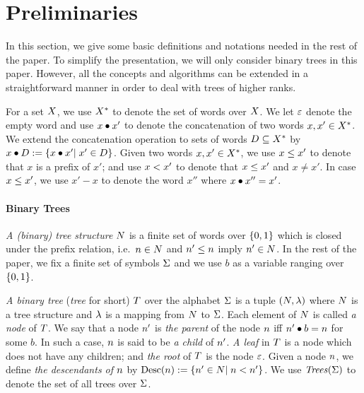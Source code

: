 \section{Preliminaries}
\label{sec:prels}
%
In this section, we give some basic definitions and notations needed in 
the rest of the paper.
%
To simplify the presentation, we will only consider binary trees in this paper.
%
However, all the concepts and algorithms can be extended in a straightforward manner in order to deal
with trees of higher ranks.
%

For a set $X$, we use ${X}^*$ to denote the set of words over $X$.
%
We let $\varepsilon$ denote the empty word and use $x\bullet x'$ to denote 
the concatenation of two words $x,x'\in{X}^*$.
%
We extend the concatenation operation to sets of words $D\subseteq{
X}^*$ by $x\bullet D:=\left\{x\bullet x'|\;x'\in D\right\}$.
%
Given two words $x,x'\in{X}^*$, we use $x\le x'$ to denote that $x$ 
is a prefix of $x'$; and use $x< x'$ to denote that $x\le x'$ and $x\neq x'$.
%
In case $x\le x'$, we use $x'-x$ to denote the word $x''$ where $x\bullet x''=x'$.
%

\paragraph{\bf Binary Trees}
%
\emph{A (binary) tree structure} $N$ is a finite set of words over $\left\{0,1\right\}$ 
which is closed under the prefix relation, i.e.\ $n\in N$ and $n'\le
n$ imply $n'\in N$.
%
In the rest of the paper, we fix a finite set of symbols $\Sigma$ and we use $b$ 
as a variable ranging over $\left\{0,1\right\}$.
%

\emph{A binary tree} (\emph{tree} for short) $T$ over the alphabet $\Sigma$ 
is a tuple $\left(N,\lambda\right)$ where $N$ is a tree structure and $\lambda$ 
is a mapping from $N$ to $\Sigma$.
%
Each element of $N$ is called \emph{a node} of $T$.
%
We say that a node $n'$ is \emph{the parent} of the node $n$ iff $n'\bullet b=
n$ for some $b$.
%
In such a case, $n$ is said to be \emph{a child} of $n'$.
%
\emph{A leaf} in $T$ is a node which does not have any children; and \emph{the root} 
of $T$ is the node $\varepsilon$.
%
Given a node $n$, we define \emph{the descendants of $n$} by $\text{Desc}({n}):=\left\{n'
\in N|\;n<n'\right\}$.
%
We use ${\it Trees}({\Sigma})$ to denote the set of all trees over $\Sigma$. 
%

